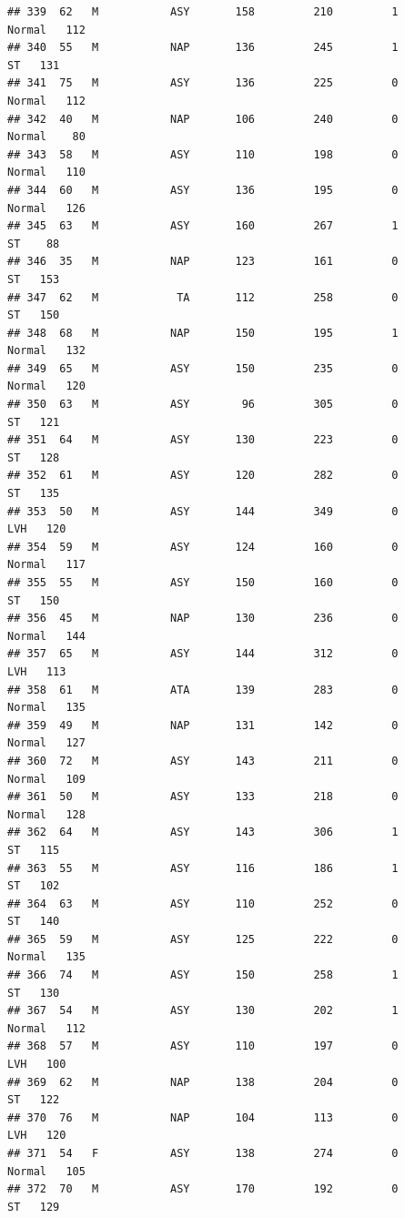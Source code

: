 \documentclass[
]{article}
\begin{document}
\begin{verbatim}
## 339  62   M           ASY       158         210         1     Normal   112
## 340  55   M           NAP       136         245         1         ST   131
## 341  75   M           ASY       136         225         0     Normal   112
## 342  40   M           NAP       106         240         0     Normal    80
## 343  58   M           ASY       110         198         0     Normal   110
## 344  60   M           ASY       136         195         0     Normal   126
## 345  63   M           ASY       160         267         1         ST    88
## 346  35   M           NAP       123         161         0         ST   153
## 347  62   M            TA       112         258         0         ST   150
## 348  68   M           NAP       150         195         1     Normal   132
## 349  65   M           ASY       150         235         0     Normal   120
## 350  63   M           ASY        96         305         0         ST   121
## 351  64   M           ASY       130         223         0         ST   128
## 352  61   M           ASY       120         282         0         ST   135
## 353  50   M           ASY       144         349         0        LVH   120
## 354  59   M           ASY       124         160         0     Normal   117
## 355  55   M           ASY       150         160         0         ST   150
## 356  45   M           NAP       130         236         0     Normal   144
## 357  65   M           ASY       144         312         0        LVH   113
## 358  61   M           ATA       139         283         0     Normal   135
## 359  49   M           NAP       131         142         0     Normal   127
## 360  72   M           ASY       143         211         0     Normal   109
## 361  50   M           ASY       133         218         0     Normal   128
## 362  64   M           ASY       143         306         1         ST   115
## 363  55   M           ASY       116         186         1         ST   102
## 364  63   M           ASY       110         252         0         ST   140
## 365  59   M           ASY       125         222         0     Normal   135
## 366  74   M           ASY       150         258         1         ST   130
## 367  54   M           ASY       130         202         1     Normal   112
## 368  57   M           ASY       110         197         0        LVH   100
## 369  62   M           NAP       138         204         0         ST   122
## 370  76   M           NAP       104         113         0        LVH   120
## 371  54   F           ASY       138         274         0     Normal   105
## 372  70   M           ASY       170         192         0         ST   129

\end{verbatim}
\end{document}
